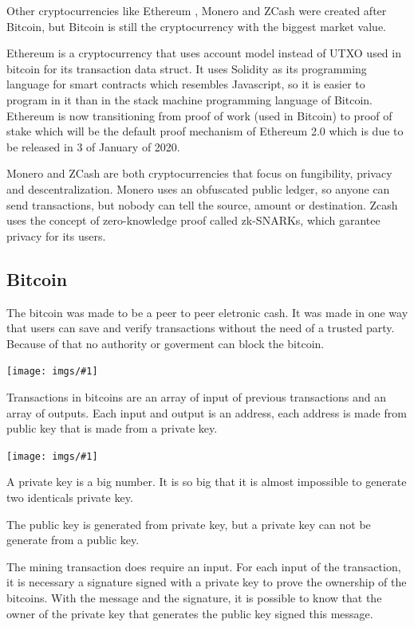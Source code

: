 \documentclass[12pt]{article}
\newcommand{\incimg}[1]{\texttt{[image: imgs/\#1]}}
\begin{document}
Other cryptocurrencies like Ethereum \cite{wood2014ethereum}, Monero \cite{noether2015ring} and
ZCash \cite{hopwood2016zcash} were created after Bitcoin,
but Bitcoin is still the cryptocurrency with the biggest market value.

Ethereum is a cryptocurrency that uses account model instead of UTXO used in bitcoin for its
transaction data struct.
It uses Solidity as its programming language for smart contracts which resembles Javascript,
so it is easier to program in it than in the stack machine programming language of Bitcoin.
Ethereum is now transitioning from proof of work (used in Bitcoin) to proof of stake
which will be the default proof mechanism of Ethereum 2.0 which is due to be released in
3 of January of 2020.

Monero and ZCash are both cryptocurrencies that focus on fungibility, privacy and descentralization.
Monero uses an obfuscated public ledger, so anyone can send transactions,
but nobody can tell the source, amount or destination.
Zcash uses the concept of zero-knowledge proof called zk-SNARKs, which garantee privacy for its users.

\subsection{Bitcoin}

The bitcoin was made to be a peer to peer eletronic cash.
It was made in one way that users can save and verify transactions without the need of a trusted party.
Because of that no authority or goverment can block the bitcoin.

\incimg{transactions1.png}

Transactions in bitcoins are an array of input of previous transactions and an array of outputs.
Each input and output is an address, each address is made from public key that is made from a private key.

\incimg{privatekey.png}

A private key is a big number.
It is so big that it is almost impossible to generate two identicals private key.

The public key is generated from private key,
but a private key can not be generate from a public key.

The mining transaction does require an input.
For each input of the transaction, it is necessary a signature signed with a private key to prove the
ownership of the bitcoins.
With the message and the signature, it is possible to know that the owner of the private key
that generates the public key signed this message.
\end{document}
